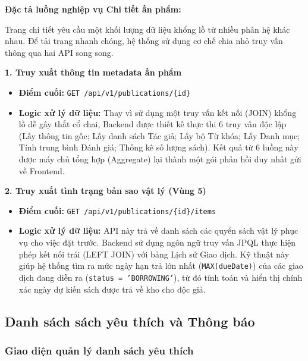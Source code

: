 \vspace{0.5cm}
\noindent\textbf{Đặc tả luồng nghiệp vụ Chi tiết ấn phẩm:}

Trang chi tiết yêu cầu một khối lượng dữ liệu khổng lồ từ nhiều phân hệ khác nhau. Để tải trang nhanh chóng, hệ thống sử dụng cơ chế chia nhỏ truy vấn thông qua hai API song song.

\noindent\textbf{1. Truy xuất thông tin metadata ấn phẩm}
\begin{itemize}
    \item \textbf{Điểm cuối:} \texttt{GET /api/v1/publications/\{id\}}
    \item \textbf{Logic xử lý dữ liệu:} Thay vì sử dụng một truy vấn kết nối (JOIN) khổng lồ dễ gây thắt cổ chai, Backend được thiết kế thực thi 6 truy vấn độc lập (Lấy thông tin gốc; Lấy danh sách Tác giả; Lấy bộ Từ khóa; Lấy Danh mục; Tính trung bình Đánh giá; Thống kê số lượng sách). Kết quả từ 6 luồng này được máy chủ tổng hợp (Aggregate) lại thành một gói phản hồi duy nhất gửi về Frontend.
\end{itemize}

\noindent\textbf{2. Truy xuất tình trạng bản sao vật lý (Vùng 5)}
\begin{itemize}
    \item \textbf{Điểm cuối:} \texttt{GET /api/v1/publications/\{id\}/items}
    \item \textbf{Logic xử lý dữ liệu:} API này trả về danh sách các quyển sách vật lý phục vụ cho việc đặt trước. Backend sử dụng ngôn ngữ truy vấn JPQL thực hiện phép kết nối trái (LEFT JOIN) với bảng Lịch sử Giao dịch. Kỹ thuật này giúp hệ thống tìm ra mức ngày hạn trả lớn nhất (\texttt{MAX(dueDate)}) của các giao dịch đang diễn ra (\texttt{status = 'BORROWING'}), từ đó tính toán và hiển thị chính xác ngày dự kiến sách được trả về kho cho độc giả.
\end{itemize}


\subsection{Danh sách sách yêu thích và Thông báo}

\subsubsection{Giao diện quản lý danh sách yêu thích}

